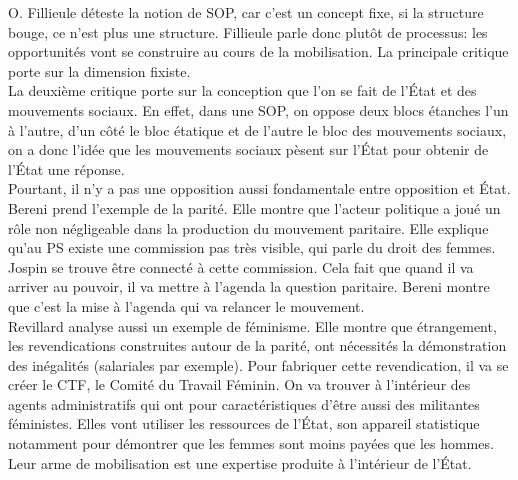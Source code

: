 \documentclass[10pt, a4paper, openany]{book}
\begin{document}
O. Fillieule déteste la notion de SOP, car c'est un concept fixe, si la structure bouge, ce n'est plus une structure. Fillieule parle donc plutôt de processus: les opportunités vont se construire au cours de la mobilisation. La principale critique porte sur la dimension fixiste. \\
La deuxième critique porte sur la conception que l'on se fait de l'État et des mouvements sociaux. En effet, dans une SOP, on oppose deux blocs étanches l'un à l'autre, d'un côté le bloc étatique et de l'autre le bloc des mouvements sociaux, on a donc l'idée que les mouvements sociaux pèsent sur l'État pour obtenir de l'État une réponse. \\
Pourtant, il n'y a pas une opposition aussi fondamentale entre opposition et État. Bereni prend l'exemple de la parité. Elle montre que l'acteur politique a joué un rôle non négligeable dans la production du mouvement paritaire. Elle explique qu'au PS existe une commission pas très visible, qui parle du droit des femmes. Jospin se trouve être connecté à cette commission. Cela fait que quand il va arriver au pouvoir, il va mettre à l'agenda la question paritaire. Bereni montre que c'est la mise à l'agenda qui va relancer le mouvement. \\
Revillard analyse aussi un exemple de féminisme. Elle montre que étrangement, les revendications construites autour de la parité, ont nécessités la démonstration des inégalités (salariales par exemple). Pour fabriquer cette revendication, il va se créer le CTF, le Comité du Travail Féminin. On va trouver à l'intérieur des agents administratifs qui ont pour caractéristiques d'être aussi des militantes féministes. Elles vont utiliser les ressources de l'État, son appareil statistique notamment pour démontrer que les femmes sont moins payées que les hommes. Leur arme de mobilisation est une expertise produite à l'intérieur de l'État. 
\end{document}

